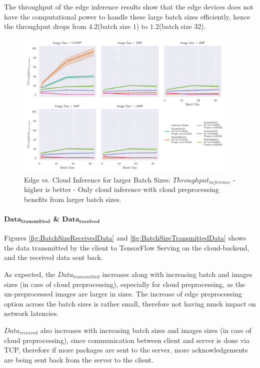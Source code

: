 The throughput of the edge inference results show that the edge devices does not have the computational power to handle these large batch sizes efficiently, hence the throughput drops from $4.2$(batch size $1$) to $1.2$(batch size $32$).
\begin{figure}[!htb]
\centering
\includegraphics[width=0.95\textwidth]{./Bilder/single_plots/batch_size_plots/Effects_of_Batch_size_Inference_Throughput.pdf}
\caption[Edge vs. Cloud Inference for larger Batch Sizes:  $Throughput_{inference}$ - higher is better]{Edge vs. Cloud Inference for larger Batch Sizes:  $Throughput_{inference}$ - higher is better - Only cloud inference with cloud preprocessing benefits from larger batch sizes.}
\label{fig:BatchSizeInferenceThroughput}
\end{figure}

\paragraph{$\mathbf{Data_{transmitted}}$ \& $\mathbf{Data_{received}}$}
Figures \ref{fig:BatchSizeReceivedData} and \ref{fig:BatchSizeTransmittedData} shows the data transmitted by the client to TensorFlow Serving on the cloud-backend, and the received data sent back.

As expected, the $Data_{transmitted}$ increases along with increasing batch and images sizes (in case of cloud preprocessing), especially for cloud preprocessing, as the un-preprocessed images are larger in sizes.
The increase of edge preprocessing option across the batch sizes is rather small, therefore not having much impact on network latencies.

$Data_{received}$ also increases with increasing batch sizes and images sizes (in case of cloud preprocessing), since communication between client and server is done via TCP, therefore if more packages are sent to the server, more acknowledgements are being sent back from the server to the client.


